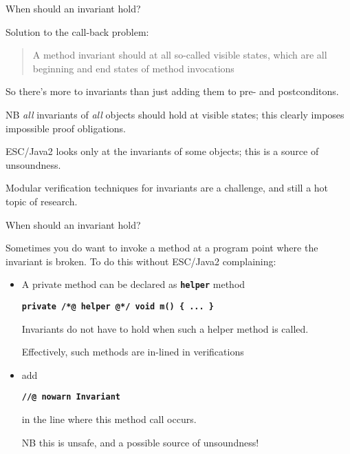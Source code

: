 \documentclass[
pdf,
nocolorBG,
slideColor,
erik,
]{prosper}
\newcommand{\code}[1]{{\rm \texttt{\textbf{\small #1}}}}
\begin{document}
\begin{slide}{When should an invariant hold?}
\vspace*{-3ex}

Solution to the call-back problem:
\begin{quote}
A method invariant should at all so-called {\blue visible states},
which are all beginning and end states of method invocations
\end{quote}


So there's more to invariants than just adding them to pre- and postconditons.

\medskip

NB \textit{all} invariants of \textit{all} objects should hold at 
visible states;
this clearly imposes impossible proof obligations.

\medskip

ESC/Java2 looks only at the invariants of some objects;
this is a source of unsoundness.

\medskip

Modular verification techniques for invariants are a challenge, and still 
a hot topic of research.

\end{slide}


\begin{slide}{When should an invariant hold?}
\vspace*{-3ex}

Sometimes you do want to invoke a method at a program point
where the invariant is broken.
To do this without ESC/Java2 complaining:

\begin{itemize}
\item
A private method can be declared as \code{helper} method
\begin{alltt}\code{\scriptsize private /*@ helper @*/ void m() \{ ... \}}
\end{alltt}
Invariants do not have to hold when such a helper method is called.

\medskip

Effectively, such methods are in-lined in verifications

\item
add 
\begin{alltt}\code{\scriptsize //@ nowarn Invariant}
\end{alltt}
in the line where this method call occurs.

\smallskip

NB this is unsafe, and a possible source of unsoundness!

\end{itemize}

\end{slide}
\end{document}
